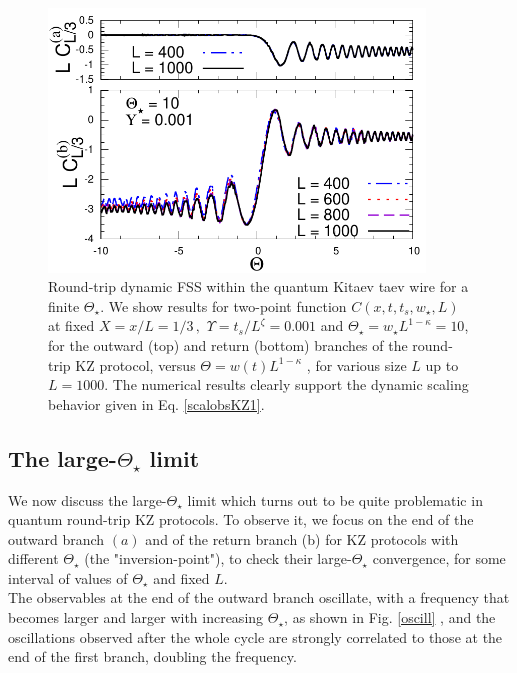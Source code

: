 \begin{figure}[!t]
        \centering
        \includegraphics[width=10cm]{imm/headKITY0001Th10C.pdf}
        \caption{Round-trip dynamic FSS within the quantum Kitaev
        taev wire for a finite $\Theta_\star$. We show results for two-point
        function $C(x,t, t_s , w_\star, L)$ at fixed 
	$X = x/L = 1/3 \,, \,\,\Upsilon =t_s /L^\zeta = 0.001$
        and $\Theta_\star = w_\star L^{1-\kappa} = 10$, for the outward (top) and return
        (bottom) branches of the round-trip KZ protocol, versus
        $\Theta = w(t)L^{1-\kappa}$ , for various size $L$ up to $L = 1000$.
	The numerical results clearly support the
        dynamic scaling behavior given in Eq. \eqref{scalobsKZ1}.}
	\label{ckitaevfss}
\end{figure}


\subsection{The large-$\Theta_\star$ limit}

We now discuss the large-$\Theta_\star$ limit which turns out to be quite problematic
in quantum round-trip KZ protocols. To observe it, we focus on the end of the outward
branch $(a)$ and of the return branch (b) for KZ protocols with different $\Theta_\star$
(the "inversion-point"), to check their large-$\Theta_\star$ convergence, for some 
interval of values of $\Theta_\star$ and fixed $L$.\\

The observables at the end
of the outward branch oscillate, with a frequency that becomes larger and larger with 
increasing $\Theta_\star$, as shown in Fig. \ref{oscill} , and the
oscillations observed after the whole cycle are strongly
correlated to those at the end of the first branch, doubling the frequency.

